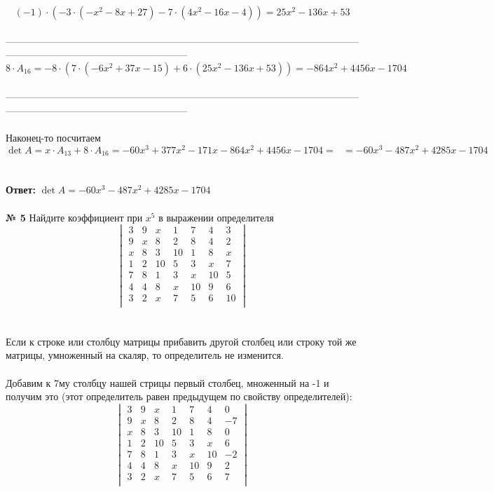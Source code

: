 \documentclass[a4paper, 12pt]{article}
\begin{document}
    \[
        (-1) \cdot (-3 \cdot (- x^{2} - 8 x + 27) - 7 \cdot (4 x^{2} - 16 x - 4)) = 25 x^{2} - 136 x + 53
    \]
    \\ --------------------------------------------------------------------------------------------------------------------------------------------------------------------
    \[
        8 \cdot A_{16} = -8 \cdot (7 \cdot (- 6 x^{2} + 37 x - 15) + 6 \cdot (25 x^{2} - 136 x + 53)) = - 864 x^{2} + 4456 x - 1704
    \]
    \\ --------------------------------------------------------------------------------------------------------------------------------------------------------------------
    \\
    \\ Наконец-то посчитаем $\det A = x \cdot A_{13} + 8 \cdot A_{16} = -60x^{3} + 377x^2 - 171x - 864 x^{2} + 4456 x - 1704 = \ \ \ = - 60 x^{3} - 487 x^{2} + 4285 x - 1704$
    \\
    \\
    \\ \textbf{Ответ: } $\det A = - 60 x^{3} - 487 x^{2} + 4285 x - 1704$
    \\
    \\ \textbf{№ 5} Найдите коэффициент при $x^5$ в выражении определителя
    \\
    \[
        \begin{vmatrix}
            3 & 9 & x & 1 & 7 & 4 & 3 \\
            9 & x & 8 & 2 & 8 & 4 & 2 \\
            x & 8 & 3 & 10 & 1 & 8 & x \\
            1 & 2 & 10 & 5 & 3 & x & 7 \\
            7 & 8 & 1 & 3 & x & 10 & 5 \\
            4 & 4 & 8 & x & 10 & 9 & 6 \\
            3 & 2 & x & 7 & 5 & 6 & 10 \\
        \end{vmatrix}
    \]
    \\
    \\ Если к строке или столбцу матрицы прибавить другой столбец или строку той же матрицы, умноженный на скаляр, то определитель не изменится.
    \\
    \\ Добавим к 7му столбцу нашей стрицы первый столбец, множенный на -1 и получим это (этот определитель равен предыдущем по свойству определителей):
    \\
    \[
        \begin{vmatrix}
            3 & 9 & x & 1 & 7 & 4 & 0 \\
            9 & x & 8 & 2 & 8 & 4 & -7 \\
            x & 8 & 3 & 10 & 1 & 8 & 0 \\
            1 & 2 & 10 & 5 & 3 & x & 6 \\
            7 & 8 & 1 & 3 & x & 10 & -2 \\
            4 & 4 & 8 & x & 10 & 9 & 2 \\
            3 & 2 & x & 7 & 5 & 6 & 7 \\
        \end{vmatrix}
    \]
\end{document}
